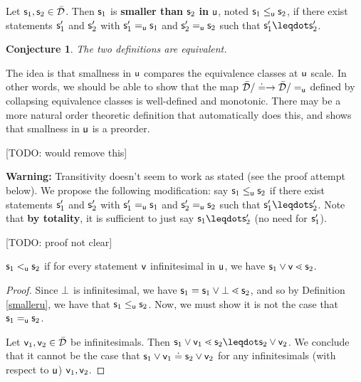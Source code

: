 \documentclass[10pt, onecolumn, nofootinbib]{revtex4-1}
\newtheorem{conj}[equation]{Conjecture}
\begin{document}
\begin{defn}\label{smalleru2}
	Let $\stmt_1, \stmt_2 \in \tdomain$. Then $\stmt_1$ is \textbf{smaller than} $\stmt_2$ \textbf{in} $\stmt[u]$, noted $\stmt_1 \lequ \stmt_2$, if there exist statements $\stmt_1'$ and $\stmt_2'$ with $\stmt_1'\equ\stmt_1$ and $\stmt_2'\equ\stmt_2$ such that $\stmt_1'\finer\stmt_2'$.
\end{defn}

\begin{conj}
	The two definitions are equivalent.
\end{conj}

\begin{remark}
	The idea is that smallness in $\stmt[u]$ compares the equivalence classes at $\stmt[u]$ scale. In other words, we should be able to show that the map $\tdomain / \eqgran \to \tdomain / \equ$ defined by collapsing equivalence classes is well-defined and monotonic. There may be a more natural order theoretic definition that automatically does this, and shows that smallness in $\stmt[u]$ is a preorder.
\end{remark}

[TODO: would remove this]

{\bf Warning:} Transitivity doesn't seem to work as stated (see the proof attempt below). We propose the following modification: say $\stmt_1\lequ\stmt_2$ if there exist statements $\stmt_1'$ and $\stmt_2'$ with $\stmt_1'\equ\stmt_1$ and $\stmt_2'\equ\stmt_2$ such that $\stmt_1'\finer\stmt_2'$. Note that {\bf by totality}, it is sufficient to just say $\stmt_1\finer\stmt_2'$ (no need for $\stmt_1'$). 

[TODO: proof not clear]

\begin{prop}
	$\stmt_1 \leu \stmt_2$ if for every statement $\stmt[v]$ infinitesimal in $\stmt[u]$, we have $\stmt_1\OR\stmt[v] \sfiner \stmt_2$. 
\end{prop}
\begin{proof}
	Since $\impossibility$ is infinitesimal, we have $\stmt_1 = \stmt_1\OR\impossibility \sfiner \stmt_2$, and so by Definition \ref{smalleru}, we have that $\stmt_1\lequ\stmt_2$. Now, we must show it is not the case that $\stmt_1\equ \stmt_2$. 
	
	Let $\stmt[v]_1,\stmt[v]_2\in\tdomain$ be infinitesimals. Then $\stmt_1\OR\stmt[v]_1 \sfiner \stmt_2 \finer\stmt_2\OR\stmt[v]_2$. We conclude that it cannot be the case that $\stmt_1 \OR \stmt[v]_1 \eqgran \stmt_2 \OR \stmt[v]_2$ for any infinitesimals (with respect to $\stmt[u]$) $\stmt[v]_1,\stmt[v]_2$. 
\end{proof}
\end{document}
